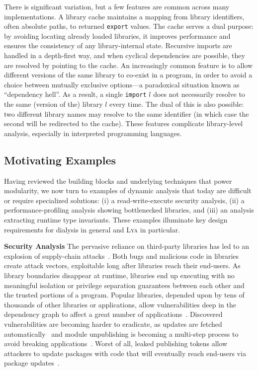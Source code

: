 \documentclass[letterpaper,twocolumn,10pt]{article}
\newcommand{\heading}[1]{\vspace{2pt}\noindent\textbf{#1}\enspace}
\newcommand{\ttt}[1]{\texttt{#1}}
\newcommand{\sys}{{\scshape Lya}\xspace}
\begin{document}
There is significant variation, but a few features are common across many implementations.
A library cache maintains a mapping from library identifiers, often absolute paths, to returned \ttt{export} values.
The cache serves a dual purpose:
  by avoiding locating already loaded libraries, it improves performance and ensures the consistency of any library-internal state.
Recursive imports are handled in a depth-first way, and when cyclical dependencies are possible, they are resolved by pointing to the cache.
An increasingly common feature is to allow different versions of the same library to co-exist in a program, in order to avoid a choice between mutually exclusive options---a paradoxical situation known as ``dependency hell''.
As a result, a single \ttt{import} $l$ does not necessarily resolve to the same (version of the) library $l$ every time.
The dual of this is also possible: two different library names may resolve to the same identifier (in which case the second will be redirected to the cache).
These features complicate library-level analysis, especially in interpreted programming languages.



\subsection{Motivating Examples}
\label{examples}

Having reviewed the building blocks and underlying techniques that power modularity, we now turn to examples of dynamic analysis that today are difficult or require specialized solutions:
  (i) a read-write-execute security analysis,
  (ii) a performance-profiling analysis showing bottlenecked libraries, and
  (iii) an analysis extracting runtime type invariants.
These examples illuminate key design requirements for dialysis in general and \sys in particular.

\heading{Security Analysis}
The pervasive reliance on third-party libraries has led to an explosion of supply-chain attacks~\cite{long2015owasp, maass2016theory, snyk, lauinger2017thou}.
Both bugs and malicious code in libraries create attack vectors, exploitable long after libraries reach their end-users.
As library boundaries disappear at runtime, libraries end up executing with no meaningful isolation or privilege separation guarantees between each other and the trusted portions of a program.
Popular libraries, depended upon by tens of thousands of other libraries or applications, allow vulnerabilities deep in the dependency graph to affect a great number of applications~\cite{leftpad, npmstudy:19}.
Discovered vulnerabilities are becoming harder to eradicate, as updates are fetched automatically~\cite{npmFailure} and module unpublishing is becoming a multi-step process to avoid breaking applications~\cite{npmUnpublish}.
Worst of all, leaked publishing tokens allow attackers to update packages with code that will eventually reach end-users via package updates~\cite{eslint1}.
\end{document}

